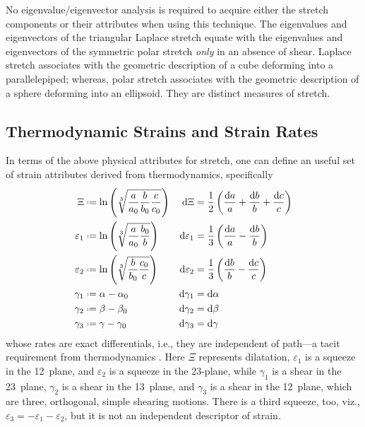 No eigen\-value\slash eigen\-vector analysis is required to acquire either the stretch components or their attributes when using this technique. \cite{Srinivasa12} The eigen\-values and eigen\-vectors of the triangular Laplace stretch equate with the eigen\-values and eigen\-vectors of the symmetric polar stretch \textit{only\/} in an absence of shear. \cite{Rosakis90}  Laplace stretch associates with the geometric description of a cube deforming into a parallelepiped; whereas, polar stretch associates with the geometric description of a sphere deforming into an ellipsoid.  They are distinct measures of stretch.

\subsection{Thermodynamic Strains and Strain Rates}
\label{strainsAndStrainRates3D}

In terms of the above physical attributes for stretch, one can define an useful set of strain attributes derived from thermo\-dynamics, specifically \cite{Freed17}
\begin{subequations}
    \label{thermodynamicStrains3D}
    \begin{align}
    \Xi & \defeq \ln \left( \sqrt[3]{\frac{a}{a_0} \frac{b}{b_0} \frac{c}{c_0}} \right) & 
    \mathrm{d} \Xi & = \frac{1}{2} \left( \frac{\mathrm{d}a}{a} + 
    \frac{\mathrm{d}b}{b} + \frac{\mathrm{d}c}{c} \right) \\
    \varepsilon_1 & \defeq \ln \left( \sqrt[3]{\frac{a}{a_0} \frac{b_0}{b}} \right) &
    \mathrm{d} \varepsilon_1 & = \frac{1}{3} \left( \frac{\mathrm{d}a}{a} - 
    \frac{\mathrm{d}b}{b} \right) \\
    \varepsilon_2 & \defeq \ln \left( \sqrt[3]{\frac{b}{b_0} \frac{c_0}{c}} \right) &
    \mathrm{d} \varepsilon_2 & = \frac{1}{3} \left( \frac{\mathrm{d}b}{b} - 
    \frac{\mathrm{d}c}{c} \right) \\
    \gamma_1 & \defeq \alpha - \alpha_0 & 
    \mathrm{d} \gamma_1 & = \mathrm{d} \alpha \\
    \gamma_2 & \defeq \beta - \beta_0 & 
    \mathrm{d} \gamma_2 & = \mathrm{d} \beta \\
    \gamma_3 & \defeq \gamma - \gamma_0 & 
    \mathrm{d} \gamma_3 & = \mathrm{d} \gamma
    \end{align}
\end{subequations}
whose rates are exact differentials, i.e., they are independent of path---a tacit requirement from thermo\-dynamics \cite{Caratheodory09}.  Here $\Xi$ represents dilatation, $\varepsilon_1$ is a squeeze in the 12~plane, and $\varepsilon_2$ is a squeeze in the 23-plane, while $\gamma_1$ is a shear in the 23~plane, $\gamma_2$ is a shear in the 13~plane, and $\gamma_3$ is a shear in the 12~plane, which are three, orthogonal, simple shearing motions.  There is a third squeeze, too, viz., $\varepsilon_3 = -\varepsilon_1 - \varepsilon_2$, but it is not an independent descriptor of strain.

